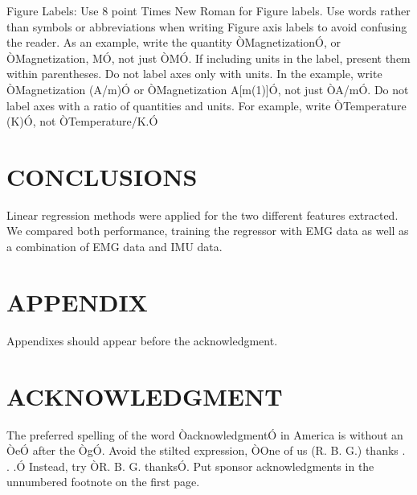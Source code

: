 \documentclass[a4paper, 10pt, conference]{ieeeconf}      %
\begin{document}
	
	
	Figure Labels: Use 8 point Times New Roman for Figure labels. Use words rather than symbols or abbreviations when writing Figure axis labels to avoid confusing the reader. As an example, write the quantity ÒMagnetizationÓ, or ÒMagnetization, MÓ, not just ÒMÓ. If including units in the label, present them within parentheses. Do not label axes only with units. In the example, write ÒMagnetization (A/m)Ó or ÒMagnetization {A[m(1)]}Ó, not just ÒA/mÓ. Do not label axes with a ratio of quantities and units. For example, write ÒTemperature (K)Ó, not ÒTemperature/K.Ó
	
	\section{CONCLUSIONS}
	
 Linear regression methods were applied for the two different features extracted. We compared both performance, training the regressor with EMG data as well as a combination of EMG data and IMU data.
	
	\addtolength{\textheight}{-12cm}   %
	
	
	
	
	
	
	
	\section*{APPENDIX}
	
	Appendixes should appear before the acknowledgment.
	
	\section*{ACKNOWLEDGMENT}
	
	The preferred spelling of the word ÒacknowledgmentÓ in America is without an ÒeÓ after the ÒgÓ. Avoid the stilted expression, ÒOne of us (R. B. G.) thanks . . .Ó  Instead, try ÒR. B. G. thanksÓ. Put sponsor acknowledgments in the unnumbered footnote on the first page.
	
\end{document}
